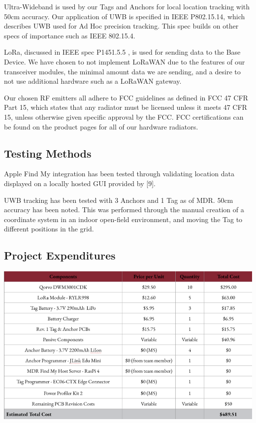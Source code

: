 \documentclass[conference]{IEEEtran}
\begin{document}
Ultra-Wideband is used by our Tags and Anchors for local location tracking 
with 50cm accuracy. Our application of UWB is specified in IEEE P802.15.14, 
which describes UWB used for Ad Hoc precision tracking. This spec builds on 
other specs of importance such as IEEE 802.15.4.

LoRa, discussed in IEEE spec P1451.5.5 , is used for sending data to the 
Base Device. We have chosen to not implement LoRaWAN due to the features of 
our transceiver modules, the minimal amount data we are sending, and a desire 
to not use additional hardware such as a LoRaWAN gateway.

Our chosen RF emitters all adhere to FCC guidelines as defined in FCC 47 
CFR Part 15, which states that any radiator must be licensed unless it
meets 47 CFR 15, unless otherwise given specific approval by the FCC. 
FCC certifications can be found on the product pages for all of our 
hardware radiators.

\subsection{Testing Methods}
Apple Find My integration has been tested through validating location 
data displayed on a locally hosted GUI provided by [9]. 

UWB tracking has been tested with 3 Anchors and 1 Tag as of MDR. 50cm 
accuracy has been noted. This was performed through the manual creation 
of a coordinate system in an indoor open-field environment, and moving 
the Tag to different positions in the grid.

\subsection{Project Expenditures}
\begin{center}
\includegraphics[scale=0.35]{mdr_project_expenditures.png}
\end{center}
\end{document}
